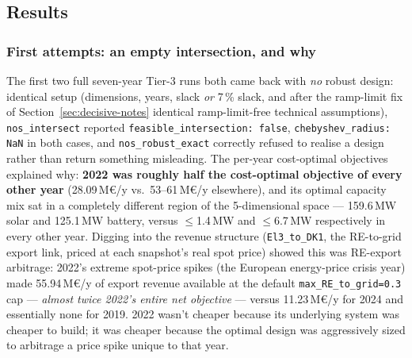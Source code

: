 \documentclass[11pt]{article}
\begin{document}
\subsection{Results}
\label{sec:decisive-results}

\subsubsection{First attempts: an empty intersection, and why}
The first two full seven-year Tier-3 runs both came back with \emph{no}
robust design: identical setup (dimensions, years, slack \emph{or}
7\,\% slack, and after the ramp-limit fix of
Section~\ref{sec:decisive-notes} identical ramp-limit-free technical
assumptions), \texttt{nos\_intersect} reported
\texttt{feasible\_intersection: false}, \texttt{chebyshev\_radius: NaN} in
both cases, and \texttt{nos\_robust\_exact} correctly refused to realise a
design rather than return something misleading. The per-year cost-optimal
objectives explained why: \textbf{2022 was roughly half the cost-optimal
objective of every other year} (28.09\,M€/y vs.\ 53--61\,M€/y elsewhere),
and its optimal capacity mix sat in a completely different region of the
5-dimensional space --- 159.6\,MW solar and 125.1\,MW battery, versus
$\le$1.4\,MW and $\le$6.7\,MW respectively in every other year.
Digging into the revenue structure (\texttt{El3\_to\_DK1}, the
RE-to-grid export link, priced at each snapshot's real spot price) showed
this was RE-export arbitrage: 2022's extreme spot-price spikes (the
European energy-price crisis year) made 55.94\,M€/y of export revenue
available at the default \texttt{max\_RE\_to\_grid=0.3} cap --- \emph{almost
twice 2022's entire net objective} --- versus 11.23\,M€/y for 2024 and
essentially none for 2019. 2022 wasn't cheaper because its underlying
system was cheaper to build; it was cheaper because the optimal design
was aggressively sized to arbitrage a price spike unique to that year.
\end{document}
